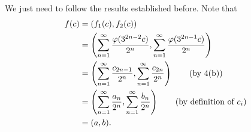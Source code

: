 \documentclass[12pt]{article}
\begin{document}
\begin{fproof}[4(c)]
    We just need to follow the results established before.
    Note that
    \begin{align*}
        f(c) &= (f_1(c), f_2(c))\\
        &= \left( \sum_{n=1}^{\infty} \frac{\varphi(3^{2n-2}c)}{2^n},\sum_{n=1}^{\infty} \frac{\varphi(3^{2n-1}c)}{2^n} \right)\\
        &=\left( \sum_{n=1}^{\infty} \frac{c_{2n-1}}{2^n} ,\sum_{n=1}^{\infty} \frac{c_{2n}}{2^n} \right) \tag{by 4(b)}\\
        &=\left( \sum_{n=1}^{\infty} \frac{a_n}{2^n}, \sum_{n=1}^{\infty} \frac{b_n}{2^n} \right) \tag{by definition of \(c_i\)}\\
        &= (a,b).
    \end{align*}
\end{fproof}
\end{document}
